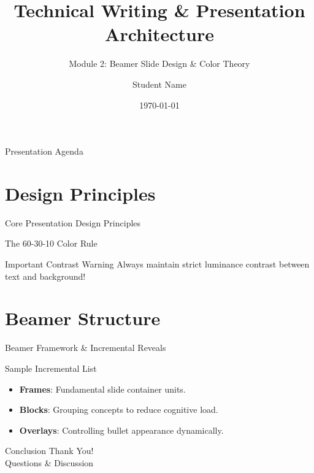 \documentclass{beamer}
\title{Technical Writing & Presentation Architecture}
\subtitle{Module 2: Beamer Slide Design & Color Theory}
\author{Student Name}
\institute{Department of Computer Science}
\date{\today}
\begin{document}
\begin{frame}
    \maketitle
\end{frame}

\begin{frame}{Presentation Agenda}
    \tableofcontents
\end{frame}

\section{Design Principles}
\begin{frame}{Core Presentation Design Principles}
    \begin{block}{The 60-30-10 Color Rule}
    \end{block}
    
    \begin{alertblock}{Important Contrast Warning}
        Always maintain strict luminance contrast between text and background!
    \end{alertblock}
\end{frame}

\section{Beamer Structure}
\begin{frame}{Beamer Framework & Incremental Reveals}
    \begin{exampleblock}{Sample Incremental List}
        \begin{itemize}
            <+->
            \item \textbf{Frames}: Fundamental slide container units.
            \item \textbf{Blocks}: Grouping concepts to reduce cognitive load.
            \item \textbf{Overlays}: Controlling bullet appearance dynamically.
        \end{itemize}
    \end{exampleblock}
\end{frame}

\begin{frame}{Conclusion}
    \centering
    \Huge Thank You! \\
    \vspace{0.5cm}
    \normalsize Questions \& Discussion
\end{frame}
\end{document}
